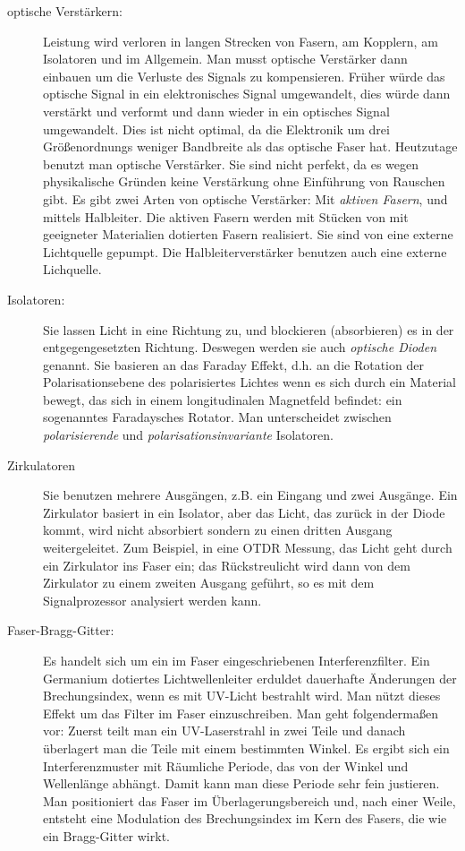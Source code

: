 \documentclass[a4paper]{article}
\begin{document}
\begin{description}
  \item[optische Verstärkern:]
    Leistung wird verloren in langen Strecken von Fasern, am Kopplern, am
    Isolatoren und im Allgemein. Man musst optische Verstärker dann einbauen um
    die Verluste des Signals zu kompensieren. 
    Früher würde das optische Signal in ein elektronisches Signal umgewandelt,
    dies würde dann verstärkt und verformt und dann wieder in ein optisches
    Signal umgewandelt.
    Dies ist nicht optimal, da die Elektronik um drei Größenordnungs weniger
    Bandbreite als das optische Faser hat.
    Heutzutage benutzt man optische Verstärker.
    Sie sind nicht perfekt, da es wegen physikalische Gründen keine Verstärkung
    ohne Einführung von Rauschen gibt.  Es gibt zwei Arten von optische
    Verstärker: Mit \emph{aktiven Fasern}, und mittels Halbleiter. Die aktiven
    Fasern werden mit Stücken von mit geeigneter Materialien dotierten Fasern
    realisiert. Sie sind von eine externe Lichtquelle gepumpt. Die
    Halbleiterverstärker benutzen auch eine externe Lichquelle. 

  
  \item[Isolatoren:] Sie lassen Licht in eine Richtung zu, und blockieren
    (absorbieren) es in der entgegengesetzten Richtung. Deswegen werden sie
    auch \emph{optische Dioden} genannt. Sie basieren an das Faraday Effekt,
    d.h. an die Rotation der Polarisationsebene des polarisiertes Lichtes wenn
    es sich durch ein Material bewegt, das sich in einem longitudinalen
    Magnetfeld befindet: ein sogenanntes Faradaysches Rotator. Man
    unterscheidet zwischen \emph{polarisierende} und
    \emph{polarisationsinvariante} Isolatoren. 

  \item[Zirkulatoren]
    Sie benutzen mehrere Ausgängen, z.B. ein Eingang und zwei Ausgänge. Ein
    Zirkulator basiert in ein Isolator, aber das Licht, das zurück in der Diode
    kommt, wird nicht absorbiert sondern zu einen dritten Ausgang
    weitergeleitet. Zum Beispiel, in eine OTDR Messung, das Licht geht durch
    ein Zirkulator ins Faser ein; das Rückstreulicht wird dann von dem
    Zirkulator zu einem zweiten Ausgang geführt, so es mit dem Signalprozessor
    analysiert werden kann.

  \item[Faser-Bragg-Gitter:] 
    Es handelt sich um ein im Faser eingeschriebenen Interferenzfilter.
    Ein Germanium dotiertes Lichtwellenleiter erduldet dauerhafte Änderungen
    der Brechungsindex, wenn es mit UV-Licht bestrahlt wird.  Man nützt dieses
    Effekt um das Filter im Faser einzuschreiben. Man geht folgendermaßen vor:
    Zuerst teilt man ein UV-Laserstrahl in zwei Teile und danach überlagert man
    die Teile mit einem bestimmten Winkel. Es ergibt sich ein Interferenzmuster
    mit Räumliche Periode, das von der Winkel und Wellenlänge abhängt. Damit
    kann man diese Periode sehr fein justieren. Man positioniert das Faser im
    Überlagerungsbereich und, nach einer Weile, entsteht eine Modulation des
    Brechungsindex im Kern des Fasers, die wie ein Bragg-Gitter wirkt.
\end{description}
\end{document}
